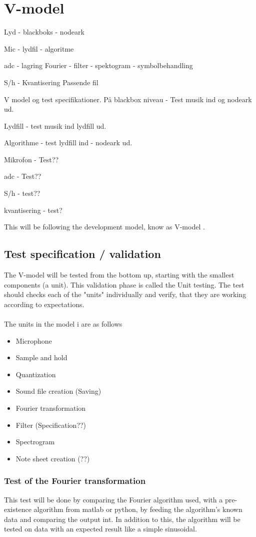 \section{V-model}

Lyd - blackboks - nodeark

Mic - lydfil - algoritme

adc - lagring  Fourier - filter - spektogram - symbolbehandling

S/h - Kvantisering  Passende fil




V model og test specifikationer.
På blackbox niveau - Test musik ind og nodeark ud.

Lydfill - test musik ind lydfill ud.

Algorithme - test lydfill ind - nodeark ud.



Mikrofon - Test??

adc - Test??

S/h - test??

kvantisering - test? 


This will be following the development model, know as  V-model \cite{v-model}.

\subsection{Test specification / validation}
The V-model will be tested from the bottom up, starting with the smallest components (a unit). This validation phase is called the Unit testing. The test should checks each of the "units" individually and verify, that they are working according to expectations. \\\\

The  units in the model i are as follows 
\begin{itemize}
	\item Microphone
	\item Sample and hold
	\item Quantization
	\item Sound file creation (Saving)
	\item Fourier transformation
	\item Filter (Specification??)
	\item Spectrogram
	\item Note sheet creation (??)
\end{itemize}


\subsubsection{Test of the Fourier transformation}
This test will be done by comparing the Fourier algorithm used, with a pre-existence algorithm from matlab or python, by feeding the algorithm's known data and comparing the output int. In addition to this, the algorithm will be tested on data with an expected result like a simple sinusoidal.\\\\

